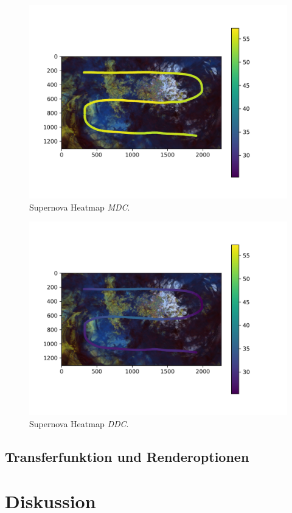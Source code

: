 \begin{figure}
	\centering
	\includegraphics[width=1\textwidth]{../../Grafiken/results/performance/supernova/ms_data_mdc_heatmap.png}
	\caption{Supernova Heatmap \emph{MDC}.}
	\label{fig::res::pf::hm_sn_mdc}
\end{figure}
\begin{figure}
	\centering
	\includegraphics[width=1\textwidth]{../../Grafiken/results/performance/supernova/ms_data_ddc_heatmap.png}
	\caption{Supernova Heatmap \emph{DDC}.}
	\label{fig::res::pf::hm_sn_ddc}
\end{figure}

\cleardoublepage

\subsection{Transferfunktion und Renderoptionen}

\section*{Diskussion}\label{sec::disc}
